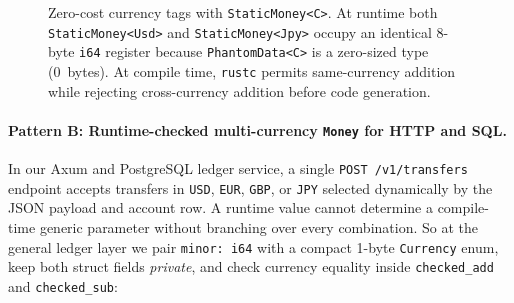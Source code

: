 \begin{figure}[H]
\caption{Zero-cost currency tags with \texttt{StaticMoney<C>}. At runtime both \texttt{StaticMoney<Usd>} and \texttt{StaticMoney<Jpy>} occupy an identical 8-byte \texttt{i64} register because \texttt{PhantomData<C>} is a zero-sized type (0~bytes). At compile time, \texttt{rustc} permits same-currency addition while rejecting cross-currency addition before code generation.}
\label{ch13:fig-phantom-currency}
\end{figure}

\paragraph{Pattern B: Runtime-checked multi-currency \texttt{Money} for HTTP and SQL.}
In our Axum and PostgreSQL ledger service, a single \texttt{POST /v1/transfers} endpoint accepts transfers in \texttt{USD}, \texttt{EUR}, \texttt{GBP}, or \texttt{JPY} selected dynamically by the JSON payload and account row. A runtime value cannot determine a compile-time generic parameter without branching over every combination. So at the general ledger layer we pair \texttt{minor: i64} with a compact 1-byte \texttt{Currency} enum, keep both struct fields \emph{private}, and check currency equality inside \texttt{checked\_add} and \texttt{checked\_sub}:

